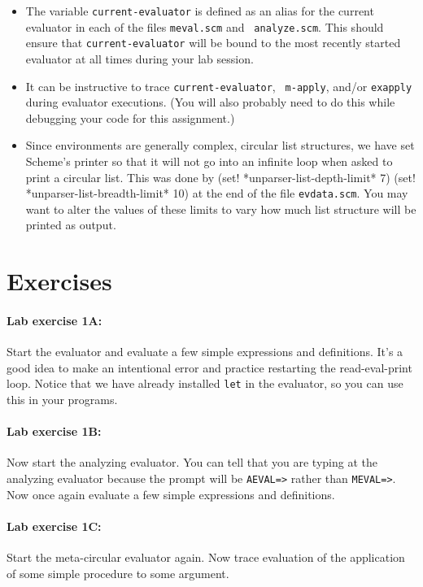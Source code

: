 \begin{itemize}
\item The variable {\tt current-evaluator} is defined as an alias for
the current evaluator in each of the files {\tt meval.scm} and {\tt
analyze.scm}.  This should ensure that {\tt current-evaluator} will be
bound to the most recently started evaluator at all times during your
lab session.

\item It can be instructive to trace {\tt current-evaluator}, {\tt
m-apply}, and/or {\tt exapply} during evaluator executions.  (You will
also probably need to do this while debugging your code for this
assignment.)

\item  Since environments are generally complex, circular list
structures, we have set Scheme's printer so that it will not go into
an infinite loop when asked to print a circular list.  This was done by
\beginlisp
(set! *unparser-list-depth-limit* 7)
(set! *unparser-list-breadth-limit* 10)
\endlisp
at the end of the file {\tt evdata.scm}.  You may want to alter the
values of these limits to vary how much list structure will be printed as
output.

\end{itemize}

\section{Exercises}

\paragraph{Lab exercise 1A:}
Start the  evaluator and evaluate a few simple expressions
and definitions.  It's a good idea to make an intentional error and
practice restarting the read-eval-print loop.  Notice that we have
already installed {\tt let} in the evaluator, so you can use this in
your programs.

\paragraph{Lab exercise 1B:}
Now start the analyzing evaluator.  You can tell that you are typing
at the analyzing evaluator because the prompt will be {\tt AEVAL=>}
rather than {\tt MEVAL=>}.  Now once again evaluate a few simple
expressions and definitions.

\paragraph{Lab exercise 1C:}
Start the meta-circular evaluator again.  Now trace evaluation of the
application of some simple procedure to some argument.


